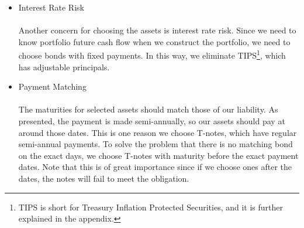 \documentclass[oneside,12pt]{report}
\begin{document}
{\begin{itemize}
\item Interest Rate Risk\\
\\
Another concern for choosing the assets is interest rate risk. Since we need to know portfolio future cash flow when we construct the portfolio, we need to choose bonds with fixed payments. In this way, we eliminate TIPS\footnote {TIPS is short for Treasury Inflation Protected Securities, and it is further explained in the appendix.}, which has adjustable principals. \\

\item Payment Matching\\
\\
The maturities for selected assets should match those of our liability. As presented, the payment is made semi-annually, so our assets should pay at around those dates. This is one reason we choose T-notes, which have regular semi-annual payments. To solve the problem that there is no matching bond on the exact days, we choose T-notes with maturity before the exact payment dates. Note that this is of great importance since if we choose ones after the dates, the notes will fail to meet the obligation.\\
\end{itemize}

}
\end{document}
